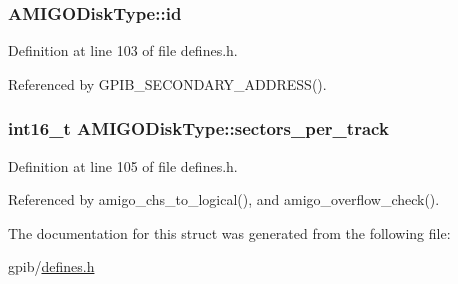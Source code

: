 \subsubsection[{\texorpdfstring{id}{id}}]{ A\+M\+I\+G\+O\+Disk\+Type\+::id}\hypertarget{structAMIGODiskType_a184bee0e5c2958f174c972130c241cbe}{}\label{structAMIGODiskType_a184bee0e5c2958f174c972130c241cbe}


Definition at line 103 of file defines.\+h.



Referenced by G\+P\+I\+B\+\_\+\+S\+E\+C\+O\+N\+D\+A\+R\+Y\+\_\+\+A\+D\+D\+R\+E\+S\+S().

\subsubsection[{\texorpdfstring{sectors\+\_\+per\+\_\+track}{sectors_per_track}}]{\setlength{\rightskip}{0pt plus 5cm}int16\+\_\+t A\+M\+I\+G\+O\+Disk\+Type\+::sectors\+\_\+per\+\_\+track}\hypertarget{structAMIGODiskType_a110284612bb89198e8c9fe31c8dabcba}{}\label{structAMIGODiskType_a110284612bb89198e8c9fe31c8dabcba}


Definition at line 105 of file defines.\+h.



Referenced by amigo\+\_\+chs\+\_\+to\+\_\+logical(), and amigo\+\_\+overflow\+\_\+check().



The documentation for this struct was generated from the following file\+:\begin{DoxyCompactItemize}
\item 
gpib/\hyperlink{defines_8h}{defines.\+h}\end{DoxyCompactItemize}
